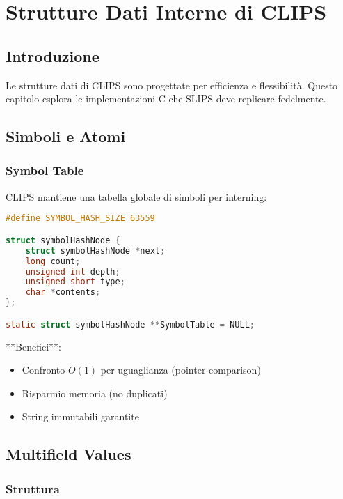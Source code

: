
\chapter{Strutture Dati Interne di CLIPS}
\label{cap:clips_strutture}

\section{Introduzione}

Le strutture dati di CLIPS sono progettate per efficienza e flessibilità. Questo capitolo esplora le implementazioni C che SLIPS deve replicare fedelmente.

\section{Simboli e Atomi}

\subsection{Symbol Table}

CLIPS mantiene una tabella globale di simboli per interning:

\begin{lstlisting}[language=C]
#define SYMBOL_HASH_SIZE 63559

struct symbolHashNode {
    struct symbolHashNode *next;
    long count;
    unsigned int depth;
    unsigned short type;
    char *contents;
};

static struct symbolHashNode **SymbolTable = NULL;
\end{lstlisting}

**Benefici**:
\begin{itemize}
\item Confronto $O(1)$ per uguaglianza (pointer comparison)
\item Risparmio memoria (no duplicati)
\item String immutabili garantite
\end{itemize}

\section{Multifield Values}

\subsection{Struttura}

